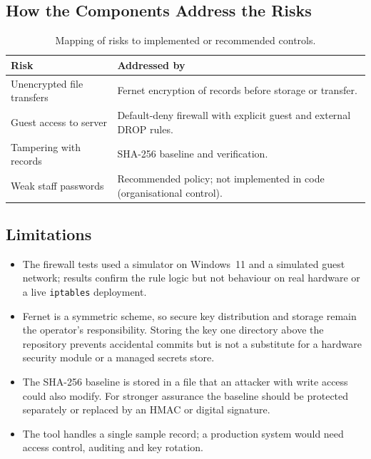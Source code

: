 \documentclass[11pt,a4paper]{article}
\begin{document}
\subsection{How the Components Address the Risks}
\begin{table}[h!]
\centering
\renewcommand{\arraystretch}{1.3}
\begin{tabular}{@{}p{4.2cm} p{10cm}@{}}
\toprule
\textbf{Risk} & \textbf{Addressed by} \\
\midrule
Unencrypted file transfers & Fernet encryption of records before storage or transfer. \\
Guest access to server     & Default-deny firewall with explicit guest and external DROP rules. \\
Tampering with records     & SHA-256 baseline and verification. \\
Weak staff passwords       & Recommended policy; not implemented in code (organisational control). \\
\bottomrule
\end{tabular}
\caption{Mapping of risks to implemented or recommended controls.}
\end{table}

\subsection{Limitations}
\begin{itemize}[leftmargin=*]
  \item The firewall tests used a simulator on Windows~11 and a simulated guest
        network; results confirm the rule logic but not behaviour on real
        hardware or a live \texttt{iptables} deployment.
  \item Fernet is a symmetric scheme, so secure key distribution and storage remain
        the operator's responsibility. Storing the key one directory above the
        repository prevents accidental commits but is not a substitute for a
        hardware security module or a managed secrets store.
  \item The SHA-256 baseline is stored in a file that an attacker with write
        access could also modify. For stronger assurance the baseline should be
        protected separately or replaced by an HMAC or digital signature.
  \item The tool handles a single sample record; a production system would need
        access control, auditing and key rotation.
\end{itemize}
\end{document}
